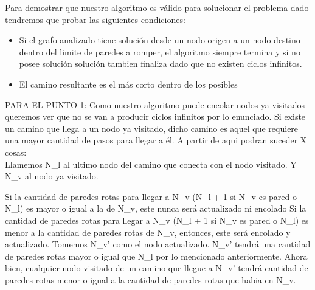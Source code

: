 Para demostrar que nuestro algoritmo es v\'alido para solucionar el problema dado tendremos que probar las siguientes condiciones:\\

\begin{itemize}
\item Si el grafo analizado tiene solución desde un nodo origen a un nodo destino dentro del limite de paredes a romper, el algoritmo siempre termina y si no posee solución solución tambien finaliza dado que no existen ciclos infinitos.
\item El camino resultante es el m\'as corto dentro de los posibles
\end{itemize}


PARA EL PUNTO 1: Como nuestro algoritmo puede encolar nodos ya visitados queremos ver que no se van a producir ciclos infinitos por lo enunciado.
Si existe un camino que llega a un nodo ya visitado, dicho camino es aquel que requiere una mayor cantidad de pasos para llegar a \'el. A partir de aqui podran suceder X cosas:\\
Llamemos N\_l al ultimo nodo del camino que conecta con el nodo visitado. Y N\_v al nodo ya visitado.

Si la cantidad de paredes rotas para llegar a N\_v (N\_l + 1 si N\_v es pared o N\_l) es mayor o igual a la de  N\_v, este nunca ser\'a actualizado ni encolado
Si la cantidad de paredes rotas para llegar a N\_v (N\_l + 1 si N\_v es pared o N\_l) es menor a la cantidad de paredes rotas de N\_v, entonces, este ser\'a encolado y actualizado. Tomemos N\_v' como el nodo actualizado.
N\_v' tendr\'a una cantidad de paredes rotas mayor o igual que N\_l por lo mencionado anteriormente. Ahora bien, cualquier nodo visitado de un camino que llegue a N\_v' tendrá cantidad de paredes rotas menor o igual a la cantidad de paredes rotas que habia en N\_v. 


